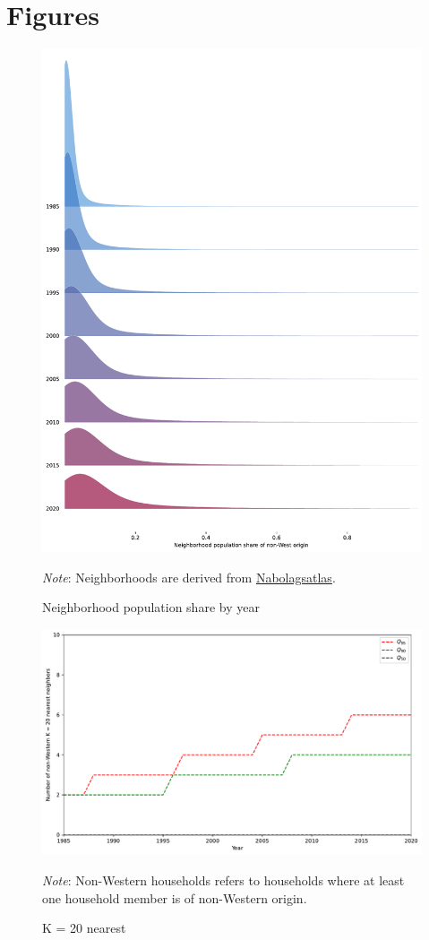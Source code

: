 \documentclass[../main.tex]{subfiles}
\begin{document}
\section{Figures}
\label{sec:appendix_figs}
\begin{figure}[H]
    \centering
    \caption{Neighborhood population share by year}
    \includegraphics[width=0.7\linewidth]{figs/neighborhood_non_west_share_density_1985_2000.pdf}
        \begin{minipage}{.9\linewidth}
        \footnotesize \textit{Note}: Neighborhoods are derived from \href{https://www.nabolagsatlas.dk/}{Nabolagsatlas}. 
    \end{minipage}
\end{figure}

\begin{figure}[H]
    \centering
    \caption{K = 20 nearest }
    \includegraphics[width=0.7\linewidth]{figs/mix_non_west_pos_nn_quantiles_1985_2020.pdf}
        \begin{minipage}{.7\linewidth}
        \footnotesize \textit{Note}: Non-Western households refers to households where at least one household member is of non-Western origin.
    \end{minipage}
\end{figure}
\end{document}
